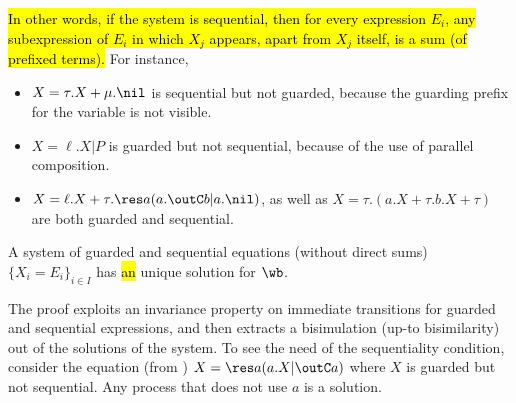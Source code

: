 \hl{In other words,
 if the system is sequential, then  for
 every expression $E_i$, any subexpression of $E_i$ in which $X_j $ 
 appears, apart from $X_j$ itself,  is a sum (of prefixed terms).}
 For instance, 
 \begin{itemize}
 \item $X = \tau. X + \mu . \nil$ is sequential but not 
  guarded, because the guarding prefix for the variable is not visible.

 \item $X =  \ell . X | P$ is guarded but not sequential, because of
   the use of parallel composition.

 \item $X =  \ell . X + \tau. \res a (a .\outC b | a.\nil)$, as well as 
 $X = \tau . (a. X + \tau . b .X + \tau  )$
are both guarded and sequential.
\end{itemize}

\begin{theorem}
\label{t:Mil89}
A system of guarded and sequential equations (without direct sums)
$\{X_i = E_i\}_{i\in I}$ has \hl{an} unique solution for $\wb$.
\end{theorem}

The proof exploits an invariance property on immediate transitions for
guarded and sequential expressions, and then extracts a bisimulation
(up-to bisimilarity) out
of the solutions of the system.
To see the  need of the sequentiality condition, consider
 the equation (from \cite{Mil89}) $X = \res a (a. X | \outC a)$
where $X$ is guarded but not sequential. Any process that does not use $a$ is a solution.

